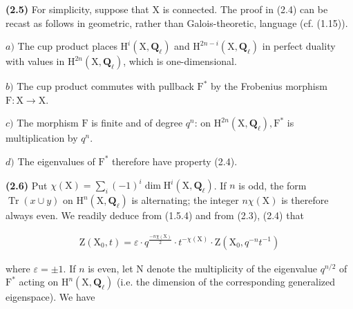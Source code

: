 \documentclass[10pt,leqno]{article}
\begin{document}
\noindent \textbf{(2.5)} For simplicity, suppose that \(\mathrm{X}\) is connected. The proof in (2.4) can be recast as follows in geometric, rather than Galois-theoretic, language (cf. (1.15)).\par

\noindent \(a)\) The cup product places \(\mathrm{H}^{i}(\mathrm{X},\mathbf{Q}_{\ell })\) and \(\mathrm{H}^{2n- i}(\mathrm{X},\mathbf{Q}_{\ell })\) in perfect duality with values in \(\mathrm{H}^{2n}(\mathrm{X},\mathbf{Q}_{\ell })\), which is one-dimensional.\par

\noindent \(b)\) The cup product commutes with pullback \(\mathrm{F}^{*}\) by the Frobenius morphism \(\mathrm{F} : \mathrm{X}\longrightarrow \mathrm{X}\).\par

\noindent \(c)\) The morphism \(\mathrm{F}\) is finite and of degree \(q^{n}\): on \(\mathrm{H}^{2n}(\mathrm{X},\mathbf{Q}_{\ell }), \mathrm{F}^{*}\) is multiplication by \(q^{n}\).\par

\noindent \(d)\) The eigenvalues of \(\mathrm{F}^{*}\) therefore have property (2.4).\par

\noindent \textbf{(2.6)} Put \(\chi (\mathrm{X})=\sum _{i}(- 1)^{i} \operatorname{dim} \mathrm{H}^{i}(\mathrm{X},\mathbf{Q}_{\ell })\). If \(n\) is odd, the form \(\operatorname{Tr}(x\cup y)\) on \(\mathrm{H}^{n}(\mathrm{X},\mathbf{Q}_{\ell })\) is alternating; the integer \(n\chi (\mathrm{X})\) is therefore always even. We readily deduce from (1.5.4) and from (2.3), (2.4) that\par

\begin{equation*}\begin{gathered}\mathrm{Z}(\mathrm{X}_{0},t) = \varepsilon \cdot q^{\frac{-n\chi(\mathrm{X})}{2}}\cdot t^{- \chi (\mathrm{X})}\cdot \mathrm{Z}(\mathrm{X}_{0},q^{- n}t^{- 1})\end{gathered}\end{equation*}

\clearpage

\label{physical-11}

\noindent where \(\varepsilon =\pm 1\). If \(n\) is even, let \(\mathrm{N}\) denote the multiplicity of the eigenvalue \(q^{n/2}\) of \(\mathrm{F}^{*}\) acting on \(\mathrm{H}^{n}(\mathrm{X},\mathbf{Q}_{\ell })\) (i.e. the dimension of the corresponding generalized eigenspace). We have\par
\end{document}
